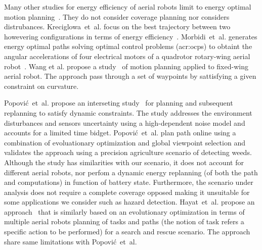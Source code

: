 Many other studies for energy efficiency of aerial robots limit to energy optimal motion planning~\citep{wang2017curvature,morbidi2016minimum,kreciglowa2017energy}. They do not consider coverage planning nor considers distrubances. Kreciglowa~et~al. focus on the best trajectory between two howevering configurations in terms of energy efficiency~\citep{kreciglowa2017energy}. Morbidi~et~al. generates energy optimal paths solving optimal control problems (\Gls{acr:ocp}s) to obtaint the angular accelerations of four electrical motors of a quadrotor rotary-wing aerial robot~\citep{morbidi2016minimum}.
Wang et al. propose a study~\citep{wang2017curvature} of motion planning applied to fixed-wing aerial robot. The approach pass through a set of waypoints by sattisfying a given constraint on curvature.

Popovi\'{c}~et~al. propose an interseting study~\citep{popovic2017online} for planning and subsequent replanning to satisfy dynamic constraints. The study addresses the environment disturbances and sensors uncertainty using a high-dependent noise model and accounts for a limited time bidget. Popovi\'{c}~et~al. plan path online using a combination of evoluationary optimization and global viewpoint selection and validates the approach using a precision agriculture scenario of detecting weeds. Although the study has similarities with our scenario, it does not account for different aerial robots, nor perfom a dynamic energy replanning (of both the path and computations) in function of battery state. Furthermore, the scenario under analysis does not require a complete coverage opposed making it unsuitable for some applications we consider such as hazard detection. Hayat~et~al. propose an approach~\citep{hayat2017multi} that is similarly based on an evolutionary optimization in terms of multiple aerial robots planning of tasks and paths (the notion of task refers a specific action to be performed) for a search and rescue scenario. The approach share same limitations with Popovi\'{c}~et~al.  

